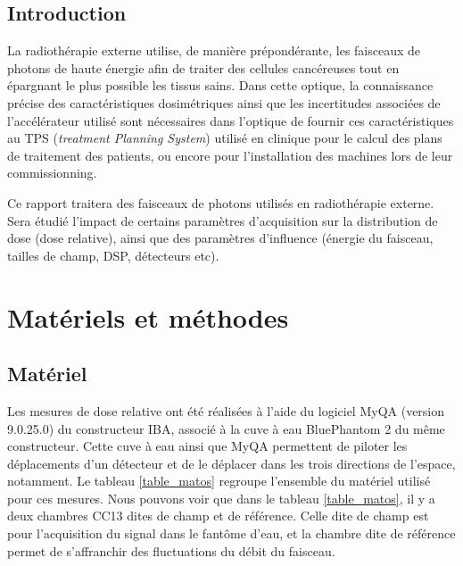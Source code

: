 \documentclass{book}
\begin{document}




\onehalfspacing

\pagestyle{fancy}
	\renewcommand\headrulewidth{0.5pt}
	\renewcommand\footrulewidth{0.5pt}
	\fancyfoot[R]{\thepage}

\tableofcontents
\clearpage
\section*{Introduction}

La radiothérapie externe utilise, de manière prépondérante, les faisceaux de photons de haute énergie afin de traiter des cellules cancéreuses tout en épargnant le plus possible les tissus sains. Dans cette optique, la connaissance précise des caractéristiques dosimétriques ainsi que les incertitudes associées de l'accélérateur utilisé sont nécessaires dans l'optique de fournir ces caractéristiques au TPS (\textit{treatment Planning System}) utilisé en clinique pour le calcul des plans de traitement des patients, ou encore pour l'installation des machines lors de leur commissionning.

Ce rapport traitera des faisceaux de photons utilisés en radiothérapie externe. Sera étudié l'impact de certains paramètres d'acquisition sur la distribution de dose (dose relative), ainsi que des paramètres d'influence (énergie du faisceau, tailles de champ, DSP, détecteurs etc).

\chapter{Matériels et méthodes}
\section{Matériel}

Les mesures de dose relative ont été réalisées à l'aide du logiciel MyQA (version 9.0.25.0) du constructeur IBA, associé à la cuve à eau BluePhantom 2 du même constructeur. Cette cuve à eau ainsi que MyQA permettent de piloter les déplacements d'un détecteur et de le déplacer dans les trois directions de l'espace, notamment. Le tableau \ref*{table_matos} regroupe l'ensemble du matériel utilisé pour ces mesures. Nous pouvons voir que dans le tableau \ref*{table_matos}, il y a deux chambres CC13 dites de champ et de référence. Celle dite de champ est pour l'acquisition du signal dans le fantôme d'eau, et la chambre dite de référence permet de s'affranchir des fluctuations du débit du faisceau.
\end{document}
